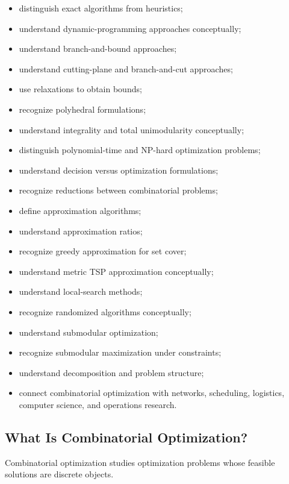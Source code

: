 {\begin{itemize}
    \item distinguish exact algorithms from heuristics;
    \item understand dynamic-programming approaches conceptually;
    \item understand branch-and-bound approaches;
    \item understand cutting-plane and branch-and-cut approaches;
    \item use relaxations to obtain bounds;
    \item recognize polyhedral formulations;
    \item understand integrality and total unimodularity conceptually;
    \item distinguish polynomial-time and NP-hard optimization problems;
    \item understand decision versus optimization formulations;
    \item recognize reductions between combinatorial problems;
    \item define approximation algorithms;
    \item understand approximation ratios;
    \item recognize greedy approximation for set cover;
    \item understand metric TSP approximation conceptually;
    \item understand local-search methods;
    \item recognize randomized algorithms conceptually;
    \item understand submodular optimization;
    \item recognize submodular maximization under constraints;
    \item understand decomposition and problem structure;
    \item connect combinatorial optimization with networks, scheduling,
          logistics, computer science, and operations research.
\end{itemize}
}

\subsection{What Is Combinatorial Optimization?}
\label{subsec:what-is-combinatorial-optimization}

Combinatorial optimization studies optimization problems whose feasible
solutions are discrete objects.

